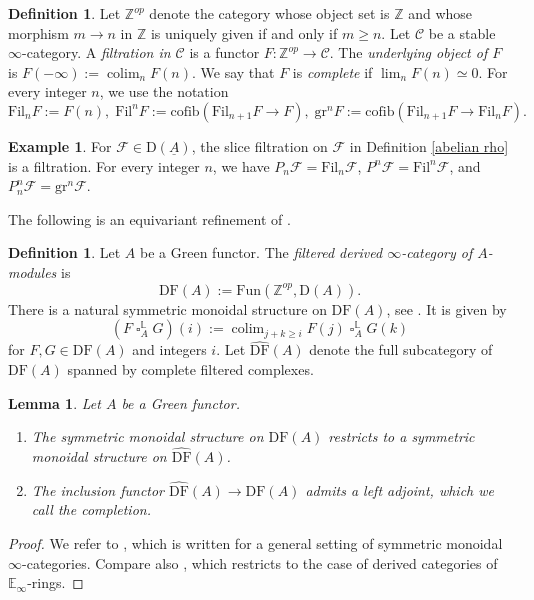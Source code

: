 \documentclass[10pt]{amsart}
\newtheorem{lem}[thm]{Lemma}
\theoremstyle{definition}
\newtheorem{df}[thm]{Definition}
\newtheorem{exm}[thm]{Example}
\numberwithin{equation}{section}
\newcommand{\E}{\mathbb{E}}
\renewcommand{\L}{\mathbb{L}}
\newcommand{\Z}{\mathbb{Z}}
\newcommand{\cC}{\mathcal{C}}
\newcommand{\cF}{\mathcal{F}}
\newcommand{\rD}{\mathrm{D}}
\newcommand{\ul}{\underline}
\newcommand{\Fun}{\mathrm{Fun}}
\newcommand{\cofib}{\mathrm{cofib}}
\newcommand{\DF}{\mathrm{DF}}
\newcommand{\gr}{\mathrm{gr}}
\newcommand{\Fil}{\mathrm{Fil}}
\newcommand{\colim}{\mathop{\mathrm{colim}}}
\DeclareMathOperator{\sotimes}{\square}
\begin{document}
\begin{df}\label{def:filtration}
Let $\Z^{op}$ denote the category whose object set is $\Z$ and whose morphism $m\to n$ in $\Z$ is uniquely given if and only if $m\geq n$.
Let $\cC$ be a stable $\infty$-category.
A \emph{filtration in $\cC$} is a functor
\(
F
\colon
\Z^{op}\to \cC.
\)
The \emph{underlying object of $F$} is $F(-\infty):=\colim_n F(n)$.
We say that $F$ is \emph{complete}
if $\lim_n F(n) \simeq 0$.
For every integer $n$,
we use the notation
\[
\Fil_nF:=F(n),
\;
\Fil^n F:=\cofib(\Fil_{n+1}F\to F),
\;
\gr^nF:=\cofib(\Fil_{n+1}F\to \Fil_nF).
\]
\end{df}

\begin{exm}
For $\cF\in \rD(\ul{A})$,
the slice filtration on $\cF$ in Definition \ref{abelian rho} is a filtration.
For every integer $n$,
we have $P_n\cF=\Fil_n \cF$,
$P^n\cF=\Fil^n \cF$, and $P_n^n\cF=\gr^n \cF$.
\end{exm}


The following is an equivariant refinement of \cite[section 5.1]{BMS19}.

\begin{df}
Let $A$ be a Green functor.
The \emph{filtered derived $\infty$-category of $A$-modules} is
\[
\DF(A)
:=
\Fun(\Z^{op},\rD(A)).
\]
There is a natural symmetric monoidal structure on $\DF(A)$,
see \cite[Theorem 1.13]{GP18}.
It is given by
\[
(F\sotimes^\L_A G)(i)
:=
\colim_{j+k\geq i}
F(j)\sotimes^\L_A G(k)
\]
for $F,G\in \DF(A)$ and integers $i$.
Let $\widehat{\DF}(A)$ denote the full subcategory of $\DF(A)$ spanned by complete filtered complexes.
\end{df}

\begin{lem}
\label{Properties of DF}
Let $A$ be a Green functor.
\begin{enumerate}
\item[\textup{(1)}]
The symmetric monoidal structure on $\DF(A)$ restricts to a symmetric monoidal structure on $\widehat{\DF}(A)$.
\item[\textup{(2)}]
The inclusion functor $\widehat{\DF}(A)\to \DF(A)$ admits a left adjoint,
which we call the \emph{completion}.
\end{enumerate}
\end{lem}
\begin{proof}
We refer to \cite{GP18},
which is written for a general setting of symmetric monoidal $\infty$-categories.
Compare also \cite[Lemma 5.2]{BMS19},
which restricts to the case of derived categories of $\E_\infty$-rings.
\end{proof}
\end{document}
